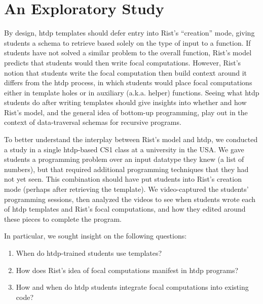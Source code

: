 \documentclass{sig-alternate-05-2015}
\newcommand{\htdp}{{\sc htdp}\xspace}
\begin{document}

\section{An Exploratory Study}
\label{sec:study}

By design, \htdp templates should defer entry into Rist's ``creation'' mode, giving students a schema to retrieve based solely on the type of input to a function. If students have not solved a similar problem to the overall function, Rist's model predicts that students would then write focal computations.  However, Rist's notion that students write the focal computation then build context around it differs from the \htdp process, in which students would place focal computations either in template holes or in auxiliary (a.k.a. helper) functions.  Seeing what \htdp students do after writing templates should give insights into whether and how Rist's model, and the general idea of bottom-up programming, play out in the context of data-traversal schemas for recursive programs.

To better understand the interplay between Rist's model and \htdp, we conducted a study in a single \htdp-based CS1 class at a university in the USA. We gave students a programming problem over an input datatype they knew (a list of numbers), but that required additional programming techniques that they had not yet seen. This combination should have put students into Rist's creation mode (perhaps after retrieving the template).  We video-captured the students' programming sessions, then analyzed the videos to see when students wrote each of \htdp templates and Rist's focal computations, and how they edited around these pieces to complete the program. 


In particular, we sought insight on the following questions:

\begin{enumerate}[itemsep=-3pt]
    \item When do \htdp-trained students use templates?
    \item How does Rist's idea of focal computations manifest in \htdp programs?
    \item How and when do \htdp students integrate focal computations into existing code?
\end{enumerate}
\end{document}
